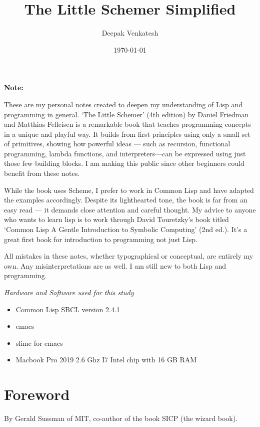 \documentclass[11pt]{article}
\author{Deepak Venkatesh}
\date{\today}
\title{The Little Schemer Simplified}
\begin{document}
\maketitle
\tableofcontents

\newpage
\textbf{Note:}

\vspace{1em}

These are my personal notes created to deepen my understanding of Lisp and programming in general. `The Little Schemer'
(4th edition) by Daniel Friedman and Matthias Felleisen is a remarkable book that teaches programming concepts in a
unique and playful way. It builds from first principles using only a small set of primitives, showing how powerful
ideas — such as recursion, functional programming, lambda functions, and interpreters—can be expressed using just
those few building blocks. I am making this public since other beginners could benefit from these notes.

While the book uses Scheme, I prefer to work in Common Lisp and have adapted the examples accordingly. Despite its
lighthearted tone, the book is far from an easy read — it demands close attention and careful thought. My advice to
anyone who wants to learn lisp is to work through David Touretzky's book titled `Common Lisp A Gentle Introduction to
Symbolic Computing' (2nd ed.). It's a great first book for introduction to programming not just Lisp.

All mistakes in these notes, whether typographical or conceptual, are entirely my own. Any misinterpretations are as
well. I am still new to both Lisp and programming.

\vspace{1em}

\emph{Hardware and Software used for this study}
\begin{itemize}
\item Common Lisp SBCL version 2.4.1
\item emacs
\item slime for emacs
\item Macbook Pro 2019 2.6 Ghz I7 Intel chip with 16 GB RAM
\end{itemize}

\newpage
\section{Foreword}
\label{sec:org05fdbe3}

By Gerald Sussman of MIT, co-author of the book SICP (the wizard book).
\end{document}
